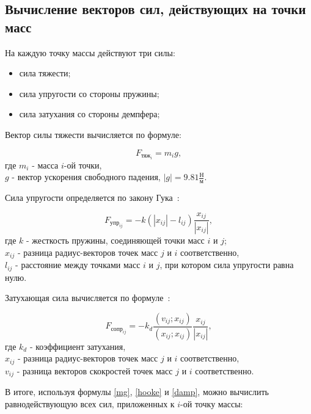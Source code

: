\subsection{Вычисление векторов сил, действующих на точки масс}

На каждую точку массы действуют три силы:

\begin{itemize}
	\item сила тяжести;
	\item сила упругости со стороны пружины;
	\item сила затухания со стороны демпфера;
\end{itemize}

Вектор силы тяжести вычисляется по формуле:

\begin{equation}\label{mg}
	F_{\text{тяж}_i} = m_i g,
\end{equation}
где $m_i$ - масса $i$-ой точки,\\
\text{~~~~~~} $g$ - вектор ускорения свободного падения, $|g| = 9.81 \frac{\text{Н}}{\text{м}}$.

Сила упругости определяется по закону Гука~\cite{muller}:

\begin{equation}\label{hooke}
	F_{\text{упр}_{ij}} = -k (|x_{ij}| - l_{ij}) \frac{x_{ij}}{|x_{ij}|},
\end{equation}
где $k$ - жесткость пружины, соединяющей точки масс $i$ и $j$;\\
\text{~~~~~~}$x_{ij}$ - разница радиус-векторов точек масс $j$ и $i$ соответственно,\\
\text{~~~~~~}$l_{ij}$ - расстояние между точками масс $i$ и $j$, при котором сила упругости равна нулю.

Затухающая сила вычисляется по формуле~\cite{muller}:

\begin{equation}\label{damp}
	F_{\text{сопр}_{ij}} = -k_d \frac{(v_{ij}; x_{ij})}{(x_{ij}; x_{ij})} \frac{x_{ij}}{|x_{ij}|},
\end{equation}
где $k_d$ - коэффициент затухания,\\
\text{~~~~~~}$x_{ij}$ - разница радиус-векторов точек масс $j$ и $i$ соответственно,\\
\text{~~~~~~}$v_{ij}$ - разница векторов скокростей точек масс $j$ и $i$ соответственно.

В итоге, используя формулы \eqref{mg}, \eqref{hooke} и \eqref{damp}, можно вычислить равнодействующую всех сил, приложенных к $i$-ой точку массы:

